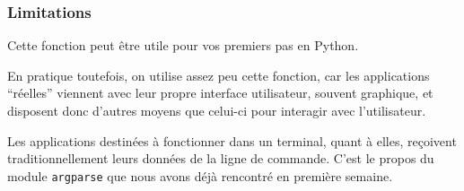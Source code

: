     \hypertarget{limitations}{%
\subsubsection{Limitations}\label{limitations}}

    Cette fonction peut être utile pour vos premiers pas en Python.

En pratique toutefois, on utilise assez peu cette fonction, car les
applications ``réelles'' viennent avec leur propre interface
utilisateur, souvent graphique, et disposent donc d'autres moyens que
celui-ci pour interagir avec l'utilisateur.

Les applications destinées à fonctionner dans un terminal, quant à
elles, reçoivent traditionnellement leurs données de la ligne de
commande. C'est le propos du module \texttt{argparse} que nous avons
déjà rencontré en première semaine.


    
    
    
